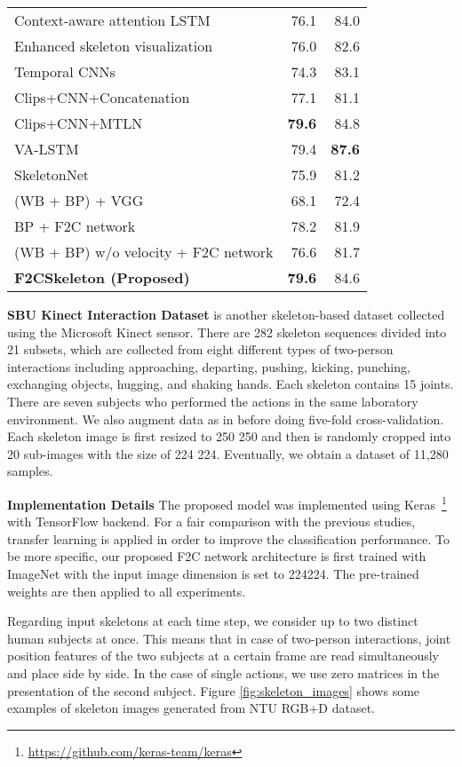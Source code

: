 \documentclass{bmvc2k}
\begin{document}
\begin{table}[t]
\begin{minipage}{0.6\textwidth}
\begin{tabular}{|l|r|r|}
			Context-aware  attention LSTM \cite{liu2018skeleton} & 76.1 & 84.0 \\
			Enhanced skeleton visualization \cite{liu2017enhanced} & 76.0 & 82.6 \\
			Temporal CNNs\cite{kim2017interpretable} & 74.3 & 83.1 \\
			Clips+CNN+Concatenation \cite{ke2017new} & 77.1 & 81.1 \\
			Clips+CNN+MTLN \cite{ke2017new} & \textbf{79.6} & 84.8 \\
			VA-LSTM \cite{zhang2017view} & 79.4 & \textbf{87.6} \\
			\hline
			SkeletonNet \cite{ke2017skeletonnet} & 75.9 & 81.2 \\
			\hline
			(WB + BP) + VGG & 68.1 & 72.4\\ 
			BP + F2C network & 78.2 & 81.9 \\
			(WB + BP) w/o velocity + F2C network & 76.6 & 81.7 \\ 
			\textbf{F2CSkeleton (Proposed)}& \textbf{79.6} & 84.6\\ 
			\hline
		\end{tabular}
	\end{minipage}
\end{table}
\textbf{SBU Kinect Interaction Dataset}
is another skeleton-based dataset collected using the Microsoft Kinect sensor. There are 282 skeleton sequences divided into 21 subsets, which are collected from eight different types of two-person interactions including approaching, departing, pushing, kicking, punching, exchanging objects, hugging, and shaking hands. Each skeleton contains 15 joints. There are seven subjects who performed the actions in the same laboratory environment. We also augment data as in \cite{ke2017skeletonnet} before doing five-fold cross-validation. Each skeleton image is first resized to 250  250 and then is randomly cropped into 20 sub-images with the size of 224 224. Eventually, we obtain a dataset of 11,280 samples.

\textbf{Implementation Details}
The proposed model was implemented using Keras~\footnote{\url{https://github.com/keras-team/keras}} with TensorFlow backend. For a fair comparison with the previous studies, transfer learning is applied in order to improve the classification performance. To be more specific, our proposed F2C network architecture is first trained with ImageNet with the input image dimension is set to 224224. The pre-trained weights are then applied to all experiments.

Regarding input skeletons at each time step, we consider up to two distinct human subjects at once. This means that in case of two-person interactions, joint position features of the two subjects at a certain frame are read simultaneously and place side by side. In the case of single actions, we use zero matrices in the presentation of the second subject. Figure \ref{fig:skeleton_images} shows some examples of skeleton images generated from NTU RGB+D dataset.
\end{document}

